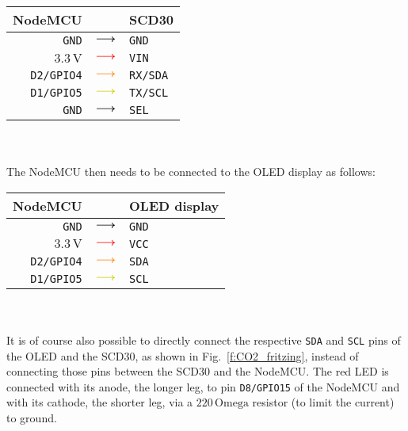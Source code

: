 \documentclass[12pt,a4paper]{article}
\newcommand*{\mathcolor}{}
\def\mathcolor#1#{\mathcoloraux{#1}}
\newcommand*{\mathcoloraux}[3]{%
  \protect\leavevmode
  \begingroup
    \color#1{#2}#3%
  \endgroup
}
\begin{document}
\begin{tabular}{rcl}\toprule
	NodeMCU		& & SCD30\\\hline
	\texttt{GND}		& $\mathcolor{black}{\boldsymbol{\longrightarrow}}$	& \texttt{GND}\\
	$3.3\,\mathrm{V}$	& $\mathcolor{red}{\boldsymbol{\longrightarrow}}$		& \texttt{VIN}\\
	\texttt{D2/GPIO4}	& $\mathcolor{orange}{\boldsymbol{\longrightarrow}}$	& \texttt{RX/SDA}\\
	\texttt{D1/GPIO5}	& $\mathcolor{Yellow3}{\boldsymbol{\longrightarrow}}$	& \texttt{TX/SCL}\\
	\texttt{GND}		& $\mathcolor{black}{\boldsymbol{\longrightarrow}}$	& \texttt{SEL}\\	
	\bottomrule
\end{tabular}\\
\quad\\

The NodeMCU then needs to be connected to the OLED display as follows:\\

\begin{tabular}{rcl}\toprule
	NodeMCU		& & OLED display\\\hline
	\texttt{GND}		& $\mathcolor{black}{\boldsymbol{\longrightarrow}}$	& \texttt{GND}\\
	$3.3\,\mathrm{V}$	& $\mathcolor{red}{\boldsymbol{\longrightarrow}}$		& \texttt{VCC}\\
	\texttt{D2/GPIO4}	& $\mathcolor{orange}{\boldsymbol{\longrightarrow}}$ 	& \texttt{SDA}\\
	\texttt{D1/GPIO5}	& $\mathcolor{Yellow3}{\boldsymbol{\longrightarrow}}$	& \texttt{SCL}\\
	\bottomrule
\end{tabular}\\
\quad\\

It is of course also possible to directly connect the respective \texttt{SDA} and \texttt{SCL} pins of the OLED and the SCD30, as shown in Fig.~\ref{f:CO2_fritzing}, instead of connecting those pins between the SCD30 and the NodeMCU. The red LED is connected with its anode, the longer leg, to pin \texttt{D8/GPIO15} of the NodeMCU and with its cathode, the shorter leg, via a $220\,\mathrm{Omega}$ resistor (to limit the current) to ground.  




\end{document}
